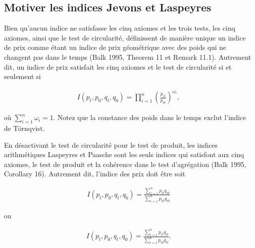 \documentclass[]{article}
\begin{document}
\hypertarget{motiver-les-indices-jevons-et-laspeyres}{%
\subsection{Motiver les indices Jevons et Laspeyres}\label{motiver-les-indices-jevons-et-laspeyres}}

Bien qu'aucun indice ne satisfasse les cinq axiomes et les trois tests, les cinq axiomes, ainsi que le test de circularité, définissent de manière unique un indice de prix comme étant un indice de prix géométrique avec des poids qui ne changent pas dans le temps (Balk 1995, Theorem 11 et Remark 11.1). Autrement dit, un indice de prix satisfait les cinq axiomes et le test de circularité si et seulement si

\begin{align*}
I(p_{t}, p_{0}, q_{t}, q_{0}) = \prod_{i = 1}^{n} \left(\frac{p_{it}}{p_{i0} } \right)^{\omega_{i}},
\end{align*}

où \(\sum_{i = 1}^{n} \omega_{i} = 1\). Notez que la constance des poids dans le temps exclut l'indice de Törnqvist.

En désactivant le test de circularité pour le test de produit, les indices arithmétiques Laspeyres et Paasche sont les seuls indices qui satisfont aux cinq axiomes, le test de produit et la cohérence dans le test d'agrégation (Balk 1995, Corollary 16). Autrement dit, l'indice des prix doit être soit

\begin{align*}
I(p_{t}, p_{0}, q_{t}, q_{0}) = \frac{\sum_{i = 1}^{n} p_{it} q_{i0}}{\sum_{i = 1}^{n} p_{i0} q_{i0}}
\end{align*}

ou

\begin{align*}
I(p_{t}, p_{0}, q_{t}, q_{0}) = \frac{\sum_{i = 1}^{n} p_{it} q_{it}}{\sum_{i = 1}^{n} p_{i0} q_{it}}.
\end{align*}
\end{document}
